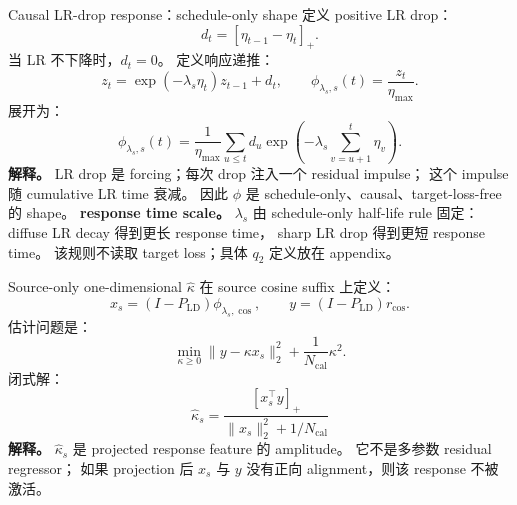 \documentclass[9pt,aspectratio=169,fontset=fandol]{ctexbeamer}
\begin{document}
\begin{frame}{Causal LR-drop response：schedule-only shape}
\small
定义 positive LR drop：
\[
d_t=[\eta_{t-1}-\eta_t]_+.
\]
当 LR 不下降时，\(d_t=0\)。
\vfill
定义响应递推：
\[
z_t=\exp(-\lambda_s\eta_t)z_{t-1}+d_t,
\qquad
\phi_{\lambda_s,s}(t)=\frac{z_t}{\eta_{\max}}.
\]
展开为：
\[
\phi_{\lambda_s,s}(t)
=
\frac{1}{\eta_{\max}}
\sum_{u\le t}
d_u
\exp\left(
-\lambda_s\sum_{v=u+1}^{t}\eta_v
\right).
\]
\vfill
\textbf{解释。}
LR drop 是 forcing；每次 drop 注入一个 residual impulse；
这个 impulse 随 cumulative LR time 衰减。
因此 \(\phi\) 是 schedule-only、causal、target-loss-free 的 shape。
\vfill
\textbf{response time scale。}
\(\lambda_s\) 由 schedule-only half-life rule 固定：
diffuse LR decay 得到更长 response time，
sharp LR drop 得到更短 response time。
该规则不读取 target loss；具体 \(q_2\) 定义放在 appendix。
\end{frame}

\begin{frame}{Source-only one-dimensional \(\widehat\kappa\)}
\small
在 source cosine suffix 上定义：
\[
x_s=(I-P_{\mathrm{LD}})\phi_{\lambda_s,\cos},
\qquad
y=(I-P_{\mathrm{LD}})r_{\cos}.
\]
估计问题是：
\[
\min_{\kappa\ge0}
\|y-\kappa x_s\|_2^2+\frac{1}{N_{\mathrm{cal}}}\kappa^2.
\]
闭式解：
\[
\boxed{
\widehat\kappa_s
=
\frac{[x_s^\top y]_+}
{\|x_s\|_2^2+1/N_{\mathrm{cal}}}
}
\]
\vfill
\textbf{解释。}
\(\widehat\kappa_s\) 是 projected response feature 的 amplitude。
它不是多参数 residual regressor；
如果 projection 后 \(x_s\) 与 \(y\) 没有正向 alignment，则该 response 不被激活。
\end{frame}
\end{document}
